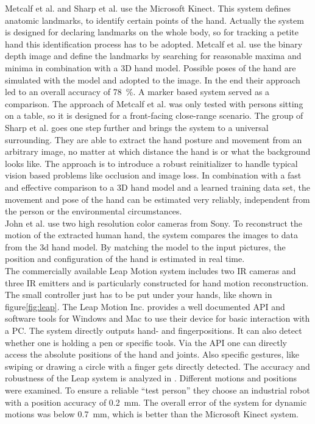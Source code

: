 Metcalf et al. and Sharp et al. use the Microsoft Kinect. This system defines anatomic landmarks, to identify certain points of the hand. Actually the system is designed for declaring landmarks on the whole body, so for tracking a petite hand this identification process has to be adopted. Metcalf et al. use the binary depth image and define the landmarks by searching for reasonable maxima and minima in combination with a 3D hand model. Possible poses of the hand are simulated with the model and adopted to the image. In the end their approach led to an overall accuracy of \SI{78}{\percent}. A marker based system served as a comparison. The approach of Metcalf et al. was only tested with persons sitting on a table, so it is designed for a front-facing close-range scenario.  The group of Sharp et al. goes one step further and brings the system to a universal surrounding. They are able to extract the hand posture and movement from an arbitrary image, no matter at which distance the hand is or what the background looks like. The approach is to introduce a robust reinitializer to handle typical vision based problems like occlusion and image loss. In combination with a fast and effective comparison to a 3D hand model and a learned training data set, the movement and pose of the hand can be estimated very reliably, independent from the person or the environmental circumstances.\\
John et al. use two high resolution color cameras from Sony. To reconstruct the motion of the extracted human hand, the system compares the images to data from the 3d hand model. By matching the model to the input pictures, the position and configuration of the hand is estimated in real time.\\
The commercially available Leap Motion system \cite{leap} includes two IR cameras and three IR emitters and is particularly constructed for hand motion reconstruction. The small controller just has to be put under your hands, like shown in figure\ref{fig:leap}. The Leap Motion Inc. provides a well documented API and software tools for Windows and Mac to use their device for basic interaction with a PC. The system directly outputs hand- and fingerpositions. It can also detect whether one is holding a pen or specific tools. Via the API one can directly access the absolute positions of the hand and joints. Also specific gestures, like swiping or drawing a circle with a finger gets directly detected. The accuracy and robustness of the Leap system is analyzed in \cite{weichert2013analysis}. Different motions and positions were examined. To ensure a reliable ``test person'' they choose an industrial robot with a position accuracy of \SI{0.2}{mm}. The overall error of the system for dynamic motions was below \SI{0.7}{\mm}, which is better than the Microsoft Kinect system.\\
